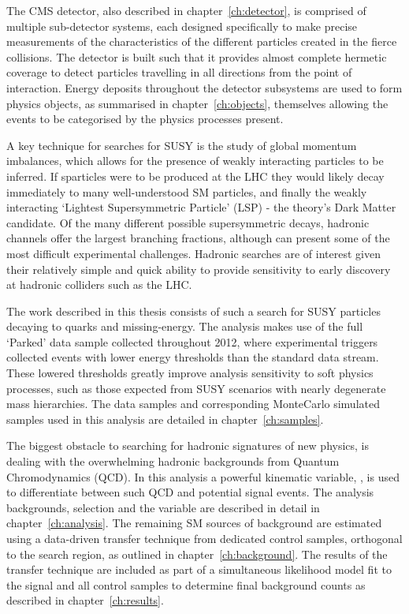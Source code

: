 The CMS detector, also described in chapter~\ref{ch:detector}, is comprised of
multiple sub-detector systems, each designed
specifically to make precise measurements of the characteristics of the
different particles created in the fierce collisions. The detector is built such
that it provides almost
complete hermetic coverage to detect particles travelling in all directions
from the point of interaction. Energy deposits throughout the detector
subsystems are used to form physics objects, as summarised in
chapter~\ref{ch:objects}, themselves allowing the events to be categorised by
the physics processes present.

A key technique
for searches for SUSY is the study of global momentum imbalances,
which allows for the presence of weakly interacting particles to be inferred.
If sparticles were to be produced at the LHC they would likely decay immediately
to many well-understood SM particles, and finally the weakly interacting
`Lightest Supersymmetric Particle' (LSP) - the theory's Dark Matter candidate.
Of the many different possible supersymmetric decays, hadronic channels offer
the largest branching fractions, although can present some of the most
difficult experimental challenges. Hadronic searches are of interest given their
relatively simple and quick ability to provide sensitivity to early discovery at
hadronic colliders such as the LHC.

The work described in this thesis consists of such a search for SUSY particles
decaying to quarks and missing-energy. The analysis makes use of the full
`Parked' data sample collected throughout 2012, where experimental
triggers collected events with lower energy thresholds than the standard data
stream.
These lowered thresholds greatly improve analysis sensitivity to soft
physics
processes, such as those expected from SUSY scenarios with nearly degenerate
mass hierarchies. The data samples and corresponding MonteCarlo simulated
samples used in this analysis are detailed in chapter~\ref{ch:samples}.

The biggest obstacle to
searching for hadronic signatures of new physics, is dealing with the
overwhelming hadronic backgrounds from Quantum Chromodynamics (QCD). In this
analysis a powerful kinematic variable, \alphat, is used to differentiate
between such QCD and potential signal events. The analysis backgrounds,
selection and
the \alphat variable are described in detail in chapter~\ref{ch:analysis}. The
remaining SM sources of background are estimated using a data-driven transfer
technique from dedicated control samples, orthogonal to the search region, as
outlined in chapter~\ref{ch:background}. The results of the transfer technique
are included as part of a simultaneous likelihood model fit to the signal and
all control samples to determine final background counts as described in
chapter~\ref{ch:results}.

